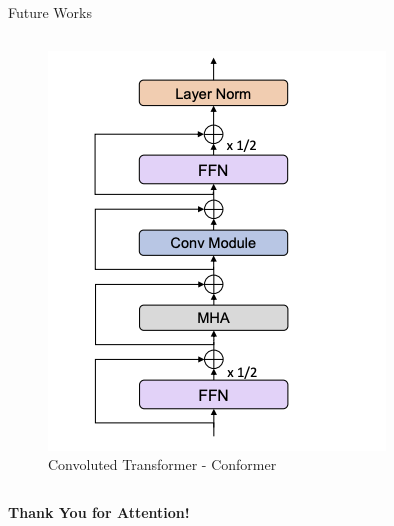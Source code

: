 \documentclass{beamer}
\begin{document}
\begin{frame}{Future Works}
\begin{columns}
    \begin{figure}[htbp]
        \centering
        \includegraphics[width=1\linewidth]{f25.png}
        \caption{Convoluted Transformer - Conformer}
        \label{fig:enter-label}
    \end{figure}
\end{columns}    
\end{frame}

\begin{frame}[c]
    \centering
    \Huge\bfseries
    Thank You for Attention! \\
    \vspace{1cm}
\end{frame}
\end{document}
